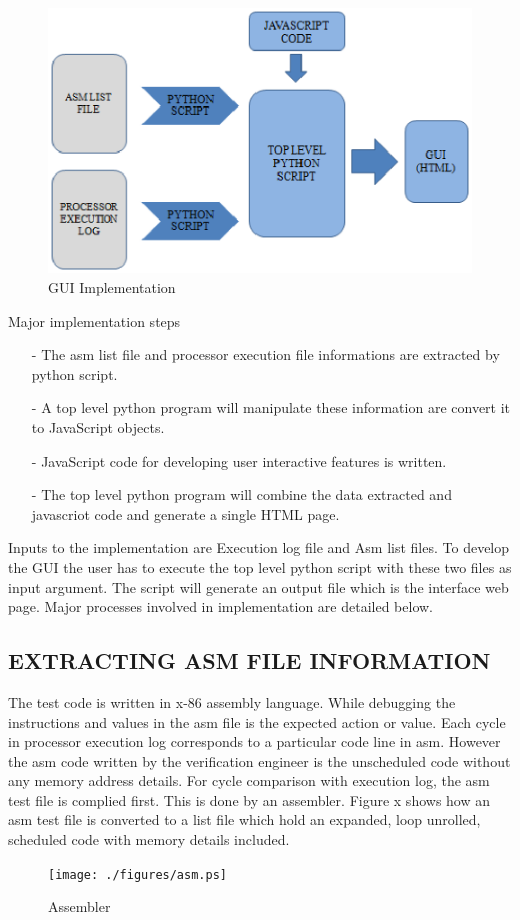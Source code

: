 \begin{figure}[H]
\centering
\includegraphics[width=5.5in]{./figures/gui_impl.eps}
\caption{GUI Implementation} 
\label{fig:gui_impl.eps}
\end{figure}

 Major implementation steps
\begin{itemize}
\item[-] The asm list file and processor execution file informations are extracted by python script.
\item[-] A top level python program will manipulate these information are convert it to JavaScript objects. 
\item[-] JavaScript code for developing user interactive features is written.
\item[-] The top level python program will combine the data extracted and javascriot code and generate a single HTML page. 
\end{itemize}
Inputs to the implementation are Execution log file and Asm list files. To develop the GUI the user has to execute the top level python script with these two files as input argument. The script will generate an output file which is the interface web page. Major processes involved in implementation are detailed below. 


\subsection {EXTRACTING ASM FILE INFORMATION}
The test code is written in x-86 assembly language. While debugging the instructions and values in the asm file is the expected action or value.  Each cycle in processor execution log corresponds to a particular code line in asm. However the asm code written by the verification engineer is the unscheduled code without any memory address details. For cycle comparison with execution log, the asm test file is complied first.  This is done by an assembler. Figure x shows how an asm test file is converted to a list file which hold an expanded, loop unrolled, scheduled code with memory details included.  
\begin{figure}[H]
\centering
\texttt{[image: ./figures/asm.ps]}
\caption{Assembler}
\end{figure}


